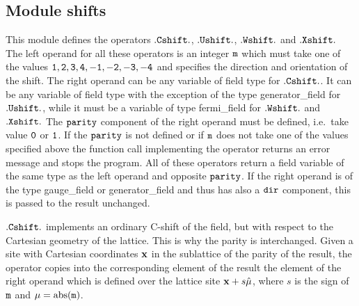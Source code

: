 








\subsection{Module shifts}
\label{shifts}

This module defines the operators $\tt .Cshift.$, $\tt .Ushift.$,
$\tt .Wshift.$ and $\tt .Xshift.$ The left operand for all these 
operators is an integer $\tt m$ which must take one of the values 
$\tt 1,2,3,4,-1,-2,-3,-4$ and specifies the direction and 
orientation of the shift.  The right operand can be any variable of
field type for $\tt .Cshift.$. It can be any variable of field type with the
exception of the type generator\_field for $\tt .Ushift.$, while it must be
a variable of type fermi\_field for $\tt .Wshift.$ and $\tt .Xshift.$  
The $\tt parity$
component of the right operand must be defined, i.e.~take value $\tt 0$
or $\tt 1$.  If the $\tt parity$ is not defined or if $\tt m$ does
not take one of the values specified above the function call 
implementing the operator returns an error message and stops the program.
All of these operators return a field variable of the same type as
the left operand and opposite $\tt parity$.  If the right operand
is of the type gauge\_field or generator\_field and thus has also
a $\tt dir$ component, this is passed to the result unchanged.

$\tt .Cshift.$ implements an ordinary C-shift of the field, but with
respect to the Cartesian geometry of the lattice.  This is why the
parity is interchanged.  Given a site with Cartesian coordinates
$\bf x$ in the sublattice of the parity of the result, the operator
copies into the corresponding element of the result the element of the 
right operand which is defined over the lattice site ${\bf x} +s \hat\mu$,
where $s$ is the sign of $\tt m$ and $\mu = {\rm abs}({\tt m})$.

